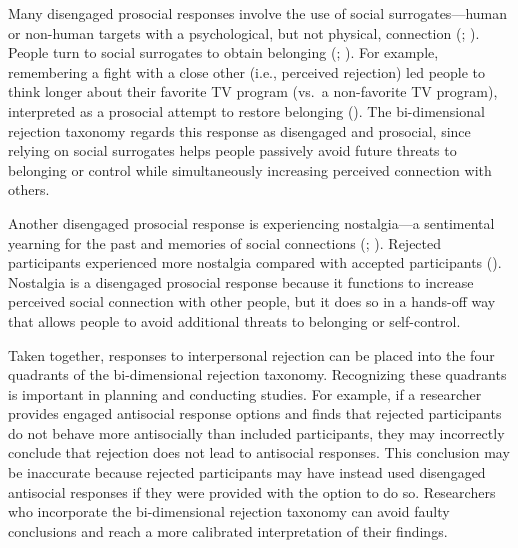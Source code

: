 \documentclass[
]{udthesis}
\begin{document}
Many disengaged prosocial responses involve the use of social
surrogates---human or non-human targets with a psychological, but not
physical, connection (; ). People turn to social surrogates to
obtain belonging (; ). For example, remembering a fight
with a close other (i.e., perceived rejection) led people to think
longer about their favorite TV program (vs.~a non-favorite TV program),
interpreted as a prosocial attempt to restore belonging
(). The bi-dimensional rejection taxonomy
regards this response as disengaged and prosocial, since relying on
social surrogates helps people passively avoid future threats to
belonging or control while simultaneously increasing perceived
connection with others.

Another disengaged prosocial response is experiencing nostalgia---a
sentimental yearning for the past and memories of social connections
(; ).
Rejected participants experienced more nostalgia compared with accepted
participants (). Nostalgia is a
disengaged prosocial response because it functions to increase perceived
social connection with other people, but it does so in a hands-off way
that allows people to avoid additional threats to belonging or
self-control.

Taken together, responses to interpersonal rejection can be placed into
the four quadrants of the bi-dimensional rejection taxonomy. Recognizing
these quadrants is important in planning and conducting studies. For
example, if a researcher provides engaged antisocial response options
and finds that rejected participants do not behave more antisocially
than included participants, they may incorrectly conclude that rejection
does not lead to antisocial responses. This conclusion may be inaccurate
because rejected participants may have instead used disengaged
antisocial responses if they were provided with the option to do so.
Researchers who incorporate the bi-dimensional rejection taxonomy can
avoid faulty conclusions and reach a more calibrated interpretation of
their findings.
\end{document}
